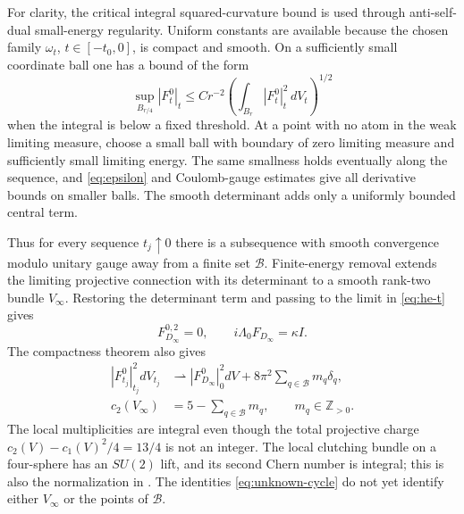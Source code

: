 \documentclass[11pt]{amsart}
\theoremstyle{definition}
\theoremstyle{remark}
\newcommand{\ZZ}{\mathbb Z}
\begin{document}
For clarity, the critical integral squared-curvature bound is used through
anti-self-dual small-energy regularity. Uniform constants are available
because the chosen family $\omega_t$, $t\in[-t_0,0]$, is compact and smooth. On a
sufficiently small coordinate ball one has a bound of the form
\begin{equation}\label{eq:epsilon}
 \sup_{B_{r/4}}|F_t^0|_t
 \le C r^{-2}\left(\int_{B_r}|F_t^0|_t^2\,dV_t\right)^{1/2}
\end{equation}
when the integral is below a fixed threshold. At a point with no atom
in the weak limiting measure, choose a small ball with boundary of
zero limiting measure and sufficiently small limiting energy. The same
smallness holds eventually along the sequence, and
\eqref{eq:epsilon} and Coulomb-gauge estimates give all derivative bounds
on smaller balls. The smooth determinant adds only a uniformly bounded
central term.

Thus for every sequence $t_j\uparrow0$ there is a subsequence with
smooth convergence modulo unitary gauge away from a finite set
$\mathcal B$. Finite-energy removal extends the limiting projective connection
with its determinant to a smooth rank-two bundle $V_\infty$. Restoring
the determinant term and passing to the limit in \eqref{eq:he-t} gives
\begin{equation}\label{eq:he-infty}
 F_{D_\infty}^{0,2}=0,
 \qquad i\Lambda_0F_{D_\infty}=\kappa I.
\end{equation}
The compactness theorem also gives
\begin{equation}\label{eq:unknown-cycle}
\begin{aligned}
 |F_{t_j}^0|_{t_j}^2dV_{t_j}
 &\rightharpoonup |F_{D_\infty}^0|_0^2dV
                     +8\pi^2\sum_{q\in\mathcal B}m_q\delta_q,\\
 c_2(V_\infty)&=5-\sum_{q\in\mathcal B}m_q,
 \qquad m_q\in\ZZ_{>0}.
\end{aligned}
\end{equation}
The local multiplicities are integral even though the total projective
charge $c_2(V)-c_1(V)^2/4=13/4$ is not an integer. The local clutching
bundle on a four-sphere has an $SU(2)$ lift, and its second Chern number
is integral; this is also the normalization in
\cite[equations~(2.32)--(2.33), Lemma~4.21]{feehanleness1998}.
The identities \eqref{eq:unknown-cycle} do not yet identify either
$V_\infty$ or the points of $\mathcal B$.
\end{document}
